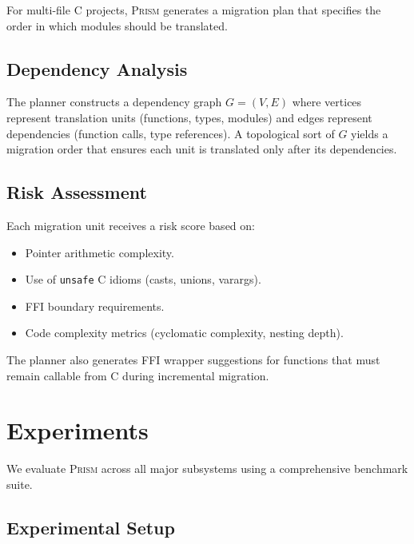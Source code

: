 \documentclass[11pt,a4paper]{article}
\begin{document}
For multi-file C projects, \textsc{Prism} generates a migration plan
that specifies the order in which modules should be translated.

\subsection{Dependency Analysis}

The planner constructs a dependency graph $G = (V, E)$ where vertices
represent translation units (functions, types, modules) and edges
represent dependencies (function calls, type references). A topological
sort of $G$ yields a migration order that ensures each unit is
translated only after its dependencies.

\subsection{Risk Assessment}

Each migration unit receives a risk score based on:
\begin{itemize}
  \item Pointer arithmetic complexity.
  \item Use of \texttt{unsafe} C idioms (casts, unions, varargs).
  \item FFI boundary requirements.
  \item Code complexity metrics (cyclomatic complexity, nesting depth).
\end{itemize}

The planner also generates FFI wrapper suggestions for functions that
must remain callable from C during incremental migration.


\section{Experiments}\label{sec:experiments}

We evaluate \textsc{Prism} across all major subsystems using a
comprehensive benchmark suite.

\subsection{Experimental Setup}
\end{document}
